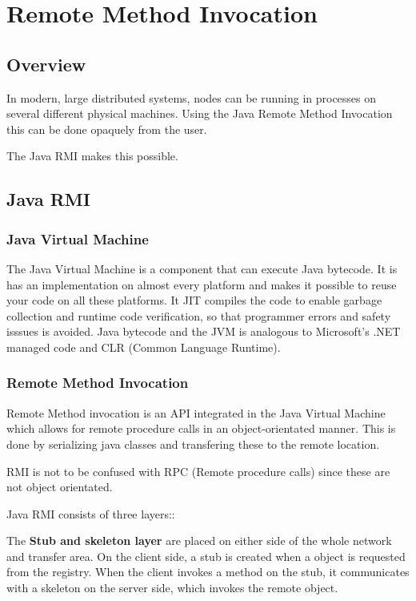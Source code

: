 \chapter{Remote Method Invocation}
\section{Overview}
In modern, large distributed systems, nodes can be running in processes on several different physical machines. Using the Java Remote Method Invocation this can be done opaquely from the user. 

The Java RMI makes this possible. 

\section{Java RMI}

\subsection{Java Virtual Machine}
The Java Virtual Machine is a component that can execute Java bytecode. It is has an implementation on almost every platform and makes it possible to reuse your code on all these platforms. It JIT compiles the code to enable garbage collection and runtime code verification, so that programmer errors and safety isssues is avoided.
Java bytecode and the JVM is analogous to Microsoft's .NET managed code and CLR (Common Language Runtime).

\subsection{Remote Method Invocation}

Remote Method invocation is an API integrated in the Java Virtual Machine which allows for remote procedure calls in an object-orientated manner. This is done by serializing java classes and transfering these to the remote location.

RMI is not to be confused with RPC (Remote procedure calls) since these are not object orientated.

Java RMI consists of three layers::

The \textbf{Stub and skeleton layer} are placed on either side of the whole network and transfer area. On the client side, a stub is created when a object is requested from the registry. When the client invokes a method on the stub, it communicates with a skeleton on the server side, which invokes the remote object.

